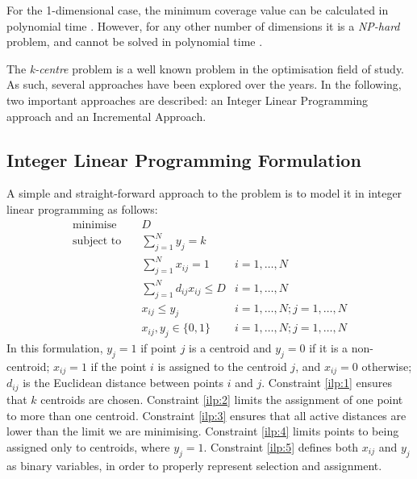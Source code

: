 

For the 1-dimensional case, the minimum coverage value can be calculated in polynomial time \cite{dvaz}. However, for any other number of dimensions it is a \emph{NP-hard} problem, and cannot be solved in polynomial time \cite{complex}.

The \emph{k-centre} problem is a well known problem in the optimisation field of study. As such, several approaches have been explored over the years. In the following, two important approaches are described: an Integer Linear Programming approach and an Incremental Approach.

\subsection{Integer Linear Programming Formulation}
\label{alg:ilp}

A simple and straight-forward approach to the problem is to model it in  integer linear programming as follows:
\begin{align}
\text{minimise}   \quad& D				   &\\
\text{subject to} \quad
& \sum\limits_{j=1}^{N}{y_j} = k 
& 							\label{ilp:1}\\
& \sum\limits_{j=1}^{N}{x_{ij}}	= 1   
& i=1,\ldots,N 				\label{ilp:2}\\
& \sum\limits_{j=1}^{N}{d_{ij} x_{ij}} \leq D
& i=1,\ldots,N				\label{ilp:3}\\
& x_{ij} \leq y_{j}				   
& i=1,\ldots,N;j=1,\ldots,N	\label{ilp:4}\\
& x_{ij},y_{j} \in \{0,1\}
& i=1,\ldots,N;j=1,\ldots,N \label{ilp:5}
\end{align}
In this formulation, $y_j = 1$ if point $j$ is a centroid and $y_j = 0$ if it is a non-centroid;
$x_{ij} = 1$ if the point $i$ is assigned to the centroid $j$, and $x_{ij}=0$ otherwise;
$d_{ij}$ is the Euclidean distance between points $i$ and $j$.
Constraint \eqref{ilp:1} ensures that $k$ centroids are chosen.
Constraint \eqref{ilp:2} limits the assignment of one point to more than one centroid.
Constraint \eqref{ilp:3} ensures that all active distances are lower than the limit we are minimising.
Constraint \eqref{ilp:4} limits points to being assigned only to centroids, where $y_j=1$.
Constraint \eqref{ilp:5} defines both $x_{ij}$ and $y_j$ as binary variables, in order to properly represent selection and assignment.

